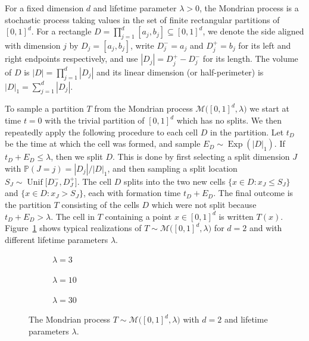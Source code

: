 \documentclass[11pt,lof]{puthesis}
\renewcommand{\P}{\ensuremath{\mathbb{P}}}
\newcommand{\cM}{\ensuremath{\mathcal{M}}}
\DeclareMathOperator{\Unif}{Unif}
\DeclareMathOperator{\Exp}{Exp}
\theoremstyle{break}
\theoremstyle{proof}
\begin{document}
For a fixed dimension $d$ and lifetime parameter $\lambda > 0$, the Mondrian
process is a stochastic process taking values in the set of finite rectangular
partitions of $[0,1]^d$. For a rectangle
$D = \prod_{j=1}^d [a_j, b_j] \subseteq [0,1]^d$,
we denote the side aligned with dimension $j$ by $D_j = [a_j, b_j]$, write
$D_j^- = a_j$ and $D_j^+ = b_j$ for its left and right endpoints respectively,
and use $|D_j| = D_j^+ - D_j^-$ for its length. The volume of $D$ is
$|D| = \prod_{j=1}^{d} |D_j|$ and its linear dimension (or half-perimeter) is
$|D|_1 = \sum_{j=1}^{d} |D_j|$.

To sample a partition $T$ from the Mondrian process
$\cM \big( [0,1]^d, \lambda \big)$ we start at time $t=0$ with the trivial
partition of $[0,1]^d$ which has no splits. We then repeatedly apply the
following procedure to each cell $D$ in the partition. Let $t_D$ be the time at
which the cell was formed, and sample $E_D \sim \Exp \left( |D|_1 \right)$. If
$t_D + E_D \leq \lambda$, then we split $D$. This is done by first selecting a
split dimension $J$ with $\P(J=j) = |D_j| / |D|_1$, and then sampling a split
location $S_J \sim \Unif\big[D_J^-, D_J^+\big]$. The cell $D$ splits into the
two new cells $\{x \in D : x_J \leq S_J\}$ and $\{x \in D : x_J > S_J\}$, each
with formation time $t_D + E_D$. The final outcome is the partition $T$
consisting of the cells $D$ which were not split because $t_D + E_D > \lambda$.
The cell in $T$ containing a point $x \in [0,1]^d$ is written $T(x)$.
Figure~\ref{fig:mondrian_process} shows typical realizations of
$T \sim \cM\big( [0,1]^d, \lambda \big)$ for $d=2$ and with different lifetime
parameters $\lambda$.
%
\begin{figure}[t]
  \centering
  \begin{subfigure}{0.32\textwidth}
    \centering
    \caption{$\lambda = 3$}
  \end{subfigure}
  \begin{subfigure}{0.32\textwidth}
    \centering
    \caption{$\lambda = 10$}
  \end{subfigure}
  \begin{subfigure}{0.32\textwidth}
    \centering
    \caption{$\lambda = 30$}
  \end{subfigure}
  \caption[The Mondrian process]{
    The Mondrian process $T \sim \cM \big( [0,1]^d, \lambda \big)$ with
  $d=2$ and lifetime parameters $\lambda$.}
  \label{fig:mondrian_process}
\end{figure}
\end{document}
